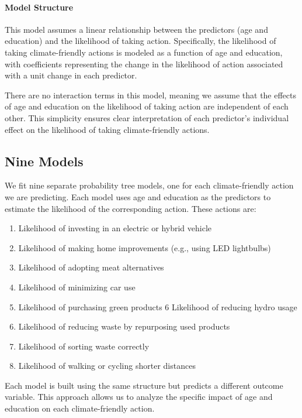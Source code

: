 \documentclass[
  letterpaper,
  DIV=11,
  numbers=noendperiod]{scrartcl}
\let\oldparagraph\paragraph
\renewcommand{\paragraph}[1]{\oldparagraph{#1}\mbox{}}
\providecommand{\tightlist}{%
  \setlength{\itemsep}{0pt}\setlength{\parskip}{0pt}}\usepackage{longtable,booktabs,array}
\begin{document}
\paragraph{Model Structure}\label{model-structure}

This model assumes a linear relationship between the predictors (age and
education) and the likelihood of taking action. Specifically, the
likelihood of taking climate-friendly actions is modeled as a function
of age and education, with coefficients representing the change in the
likelihood of action associated with a unit change in each predictor.

There are no interaction terms in this model, meaning we assume that the
effects of age and education on the likelihood of taking action are
independent of each other. This simplicity ensures clear interpretation
of each predictor's individual effect on the likelihood of taking
climate-friendly actions.

\subsection{Nine Models}\label{nine-models}

We fit nine separate probability tree models, one for each
climate-friendly action we are predicting. Each model uses age and
education as the predictors to estimate the likelihood of the
corresponding action. These actions are:

\begin{enumerate}
\def\labelenumi{\arabic{enumi}.}
\tightlist
\item
  Likelihood of investing in an electric or hybrid vehicle
\item
  Likelihood of making home improvements (e.g., using LED lightbulbs)
\item
  Likelihood of adopting meat alternatives
\item
  Likelihood of minimizing car use
\item
  Likelihood of purchasing green products 6 Likelihood of reducing hydro
  usage
\item
  Likelihood of reducing waste by repurposing used products
\item
  Likelihood of sorting waste correctly
\item
  Likelihood of walking or cycling shorter distances
\end{enumerate}

Each model is built using the same structure but predicts a different
outcome variable. This approach allows us to analyze the specific impact
of age and education on each climate-friendly action.
\end{document}
